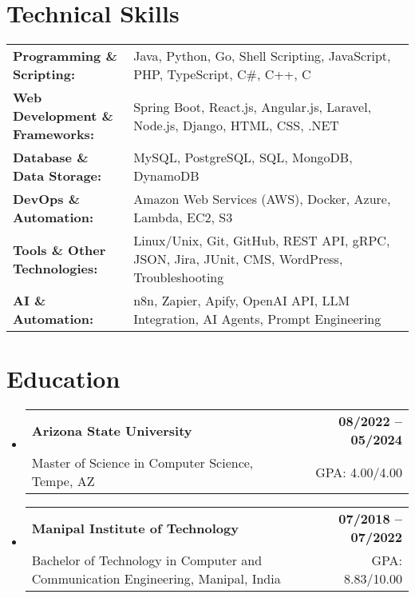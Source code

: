 \documentclass[letterpaper,11pt]{article}
\makeatletter
\newcommand{\educationSubheading}[4]{
  \vspace{-2pt}\item
    \begin{tabular*}{1.0\textwidth}[t]{l@{\extracolsep{\fill}}r}
      \textbf{\small #1} & \textbf{\small #2} \\
      {\small#3} & {\small #4} \\
    \end{tabular*}\vspace{-7pt}
}
\newcommand{\resumeSubHeadingListStart}{\begin{itemize}[leftmargin=0pt, label={}]}
\newcommand{\resumeSubHeadingListEnd}{\end{itemize}}
\makeatother
\begin{document}
\section{Technical Skills}
        \vspace{-14pt}
        \begin{table}[h]
            \footnotesize
            \begin{tabular}{p{0.3\linewidth} p{0.7\linewidth}}
                \textbf{Programming \& Scripting:} & Java, Python, Go, Shell Scripting, JavaScript, PHP, TypeScript, C\#, C++, C \\
                \textbf{Web Development \& Frameworks:} & Spring Boot, React.js, Angular.js, Laravel, Node.js, Django, HTML, CSS, .NET \\
                \textbf{Database \& Data Storage:} & MySQL, PostgreSQL, SQL, MongoDB, DynamoDB \\
                \textbf{DevOps \& Automation:} & Amazon Web Services (AWS), Docker, Azure, Lambda, EC2, S3 \\
                \textbf{Tools \& Other Technologies:} & Linux/Unix, Git, GitHub, REST API, gRPC, JSON, Jira, JUnit, CMS, WordPress, Troubleshooting \\
                \textbf{AI \& Automation:} & n8n, Zapier, Apify, OpenAI API, LLM Integration, AI Agents, Prompt Engineering \\
            \end{tabular}
        \end{table}

 \vspace{-15pt}

\section{Education}
  \resumeSubHeadingListStart
    \educationSubheading
      {Arizona State University}{08/2022 -- 05/2024}
      {Master of Science in Computer Science, Tempe, AZ}{GPA: 4.00/4.00}

    \educationSubheading
      {Manipal Institute of Technology}{07/2018 -- 07/2022}
      {Bachelor of Technology in Computer and Communication Engineering, Manipal, India}{GPA: 8.83/10.00}
  \resumeSubHeadingListEnd
\end{document}
